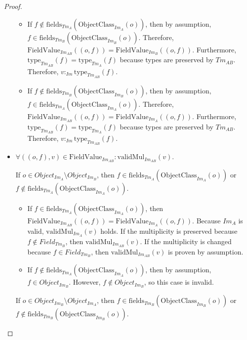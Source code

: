 \begin{proof}
\begin{itemize}
\begin{itemize}
        \item If $f \not\in \mathrm{fields}_{Tm_{A}}(\mathrm{ObjectClass}_{Im_{A}}(o))$, then by assumption, $f \in \mathrm{fields}_{Tm_{B}}(\mathrm{ObjectClass}_{Im_{B}}(o))$. Therefore, $\mathrm{FieldValue}_{Im_{AB}}(( o, f )) = \mathrm{FieldValue}_{Im_{B}}(( o, f ))$. Furthermore, $\mathrm{type}_{Tm_{AB}}(f) = \mathrm{type}_{Tm_{A}}(f)$ because types are preserved by $Tm_{AB}$. Therefore, $v:_{Im} \mathrm{type}_{Tm_{AB}}(f)$.
        
        \item If $f \not\in \mathrm{fields}_{Tm_{B}}(\mathrm{ObjectClass}_{Im_{B}}(o))$, then by assumption, $f \in \mathrm{fields}_{Tm_{A}}(\mathrm{ObjectClass}_{Im_{A}}(o))$. Therefore, $\mathrm{FieldValue}_{Im_{AB}}(( o, f )) = \mathrm{FieldValue}_{Im_{A}}(( o, f ))$. Furthermore, $\mathrm{type}_{Tm_{AB}}(f) = \mathrm{type}_{Tm_{A}}(f)$ because types are preserved by $Tm_{AB}$. Therefore, $v:_{Im} \mathrm{type}_{Tm_{AB}}(f)$.
    \end{itemize}
    
    
    \item $\forall (( o, f ), v ) \in \mathrm{FieldValue}_{Im_{AB}}\!: \mathrm{validMul}_{Im_{AB}}(v)$.
    
    If $o \in Object_{Im_A} \setminus Object_{Im_B}$, then $f \in \mathrm{fields}_{Tm_{A}}(\mathrm{ObjectClass}_{Im_{A}}(o))$ or \\$f \not\in \mathrm{fields}_{Tm_{A}}(\mathrm{ObjectClass}_{Im_{A}}(o))$.
    
    \begin{itemize}
        \item If $f \in \mathrm{fields}_{Tm_{A}}(\mathrm{ObjectClass}_{Im_{A}}(o))$, then $\mathrm{FieldValue}_{Im_{AB}}(( o, f )) = \mathrm{FieldValue}_{Im_{A}}(( o, f ))$. Because $Im_{A}$ is valid, $\mathrm{validMul}_{Im_{A}}(v)$ holds. If the multiplicity is preserved because $f \not\in Field_{Tm_B}$, then $\mathrm{validMul}_{Im_{AB}}(v)$. If the multiplicity is changed because $f \in Field_{Tm_B}$, then $\mathrm{validMul}_{Im_{AB}}(v)$ is proven by assumption.
        
        \item If $f \not\in \mathrm{fields}_{Tm_{A}}(\mathrm{ObjectClass}_{Im_{A}}(o))$, then by assumption, $f \in Object_{Im_B}$. However, $f \not\in Object_{Im_B}$, so this case is invalid.
    \end{itemize}
    
    If $o \in Object_{Im_B} \setminus Object_{Im_A}$, then $f \in \mathrm{fields}_{Tm_{B}}(\mathrm{ObjectClass}_{Im_{B}}(o))$ or \\$f \not\in \mathrm{fields}_{Tm_{B}}(\mathrm{ObjectClass}_{Im_{B}}(o))$.
    

\end{itemize}
\end{proof}

